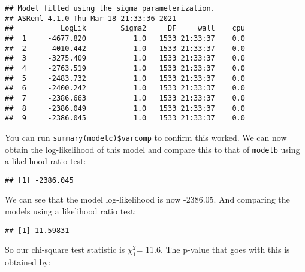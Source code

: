 \documentclass[
  12pt,
]{book}
\newenvironment{Shaded}{\begin{snugshade}}{\end{snugshade}}
\newcommand{\DecValTok}[1]{\textcolor[rgb]{0.00,0.00,0.81}{#1}}
\newcommand{\FunctionTok}[1]{\textcolor[rgb]{0.00,0.00,0.00}{#1}}
\newcommand{\NormalTok}[1]{#1}
\newcommand{\SpecialCharTok}[1]{\textcolor[rgb]{0.00,0.00,0.00}{#1}}
\begin{document}
\begin{verbatim}
## Model fitted using the sigma parameterization.
## ASReml 4.1.0 Thu Mar 18 21:33:36 2021
##           LogLik        Sigma2     DF     wall    cpu
##  1     -4677.820           1.0   1533 21:33:37    0.0
##  2     -4010.442           1.0   1533 21:33:37    0.0
##  3     -3275.409           1.0   1533 21:33:37    0.0
##  4     -2763.519           1.0   1533 21:33:37    0.0
##  5     -2483.732           1.0   1533 21:33:37    0.0
##  6     -2400.242           1.0   1533 21:33:37    0.0
##  7     -2386.663           1.0   1533 21:33:37    0.0
##  8     -2386.049           1.0   1533 21:33:37    0.0
##  9     -2386.045           1.0   1533 21:33:37    0.0
\end{verbatim}

You can run \texttt{summary(modelc)\$varcomp} to confirm this worked. We can now obtain the log-likelihood of this model and compare this to that of \texttt{modelb} using a likelihood ratio test:

\begin{Shaded}
\end{Shaded}

\begin{verbatim}
## [1] -2386.045
\end{verbatim}

We can see that the model log-likelihood is now -2386.05.
And comparing the models using a likelihood ratio test:

\begin{Shaded}
\end{Shaded}

\begin{verbatim}
## [1] 11.59831
\end{verbatim}

So our chi-square test statistic is \(\chi^2_1\)= 11.6.
The p-value that goes with this is obtained by:

\begin{Shaded}
\end{Shaded}
\end{document}

